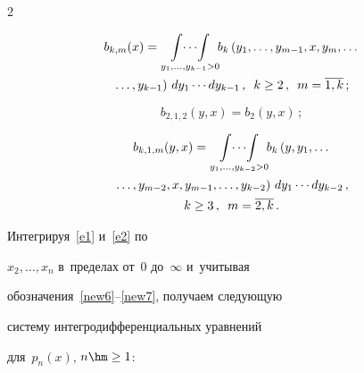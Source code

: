 \begin{multicols}{2}
\noindent


\begin{multline}


\label{new6}


b_{k,m}(x)


= \mathop{\int\!\cdots\!\int} \limits_{y_1,\ld,y_{k-1}>0}\!\!


b_k\left(y_1,\ld,y_{m-1},x,y_{m},\ld\right.\\


\left.\ld,y_{k-1}\right)\, dy_1\cdots dy_{k-1}\,,


\enskip k\ge 2\,,\enskip m=\overline{1,k}\,;


\end{multline}





\noindent


\begin{equation}


\label{new7-1}


b_{2,1,2}(y,x) = b_2(y,x)\,;


\end{equation}


\begin{multline}


\label{new7}


b_{k,1,m}(y,x)


=  \mathop{\int\!\cdots\!\int}


\limits_{y_1,\ld,y_{k-2}>0}\!\!


b_k\left(y,y_1,\ld\right.\\


\left.\ld,y_{m-2},x,y_{m-1},\ld,y_{k-2}\right)


\, dy_1\cdots dy_{k-2}\,,\\


k\ge 3\,,\enskip m=\overline{2,k}\,.


\end{multline}





\noindent 


Интегрируя~\eqref{e1} и~\eqref{e2} по


$x_2,\ldots ,x_n$ в~пределах от~0 до~$\infty$ и~учитывая 


обозначения~\eqref{new6}--\eqref{new7}, получаем следующую


систему интегродифференциальных уравнений


для~$p_{n}(x)$, $n\hm\ge 1$:



\end{multicols}
